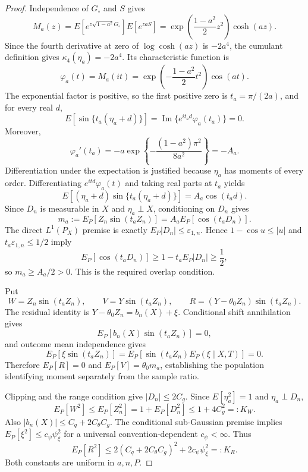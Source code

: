 \documentclass{article}
\begin{document}
\begin{proof}
Independence of \(G_{\circ}\) and \(S\) gives
\[
 M_a(z)
 =E[e^{z\sqrt{1-a^2}G_{\circ}}]E[e^{zaS}]
 =\exp\!\left(\frac{1-a^2}{2}z^2\right)\cosh(az).
\]
Since the fourth derivative at zero of \(\log\cosh(az)\) is \(-2a^4\), the cumulant definition gives \(\kappa_4(\eta_a)=-2a^4\).  Its characteristic function is
\[
 \varphi_a(t)=M_a(it)
 =\exp\!\left(-\frac{1-a^2}{2}t^2\right)\cos(at).
\]
The exponential factor is positive, so the first positive zero is \(t_a=\pi/(2a)\), and for every real \(d\),
\[
 E[\sin\{t_a(\eta_a+d)\}]
 =\operatorname{Im}\{e^{it_ad}\varphi_a(t_a)\}=0.
\]
Moreover,
\[
 \varphi_a'(t_a)
 =-a\exp\!\left\{-\frac{(1-a^2)\pi^2}{8a^2}\right\}=-A_a.
\]
Differentiation under the expectation is justified because \(\eta_a\) has moments of every order.  Differentiating \(e^{itd}\varphi_a(t)\) and taking real parts at \(t_a\) yields
\[
 E[(\eta_a+d)\sin\{t_a(\eta_a+d)\}]=A_a\cos(t_ad).
\]
Since \(D_n\) is measurable in \(X\) and \(\eta_a\perp X\), conditioning on \(D_n\) gives
\[
 m_a:=E_P[Z_n\sin(t_aZ_n)]=A_aE_P[\cos(t_aD_n)].
\]
The direct \(L^1(P_X)\) premise is exactly \(E_P|D_n|\le\varepsilon_{1,n}\).  Hence \(1-\cos u\le|u|\) and \(t_a\varepsilon_{1,n}\le1/2\) imply
\[
 E_P[\cos(t_aD_n)]
 \ge1-t_aE_P|D_n|
 \ge\frac12,
\]
so \(m_a\ge A_a/2>0\).  This is the required overlap condition.

Put
\[
 W=Z_n\sin(t_aZ_n),\qquad
 V=Y\sin(t_aZ_n),\qquad
 R=(Y-\theta_0Z_n)\sin(t_aZ_n).
\]
The residual identity is \(Y-\theta_0Z_n=b_n(X)+\xi\).  Conditional shift annihilation gives
\[
 E_P[b_n(X)\sin(t_aZ_n)]=0,
\]
and outcome mean independence gives
\[
 E_P[\xi\sin(t_aZ_n)]
 =E_P[\sin(t_aZ_n)E_P(\xi\mid X,T)]=0.
\]
Therefore \(E_P[R]=0\) and \(E_P[V]=\theta_0m_a\), establishing the population identifying moment separately from the sample ratio.

Clipping and the range condition give \(|D_n|\le2C_g\).  Since \(E[\eta_a^2]=1\) and \(\eta_a\perp D_n\),
\[
 E_P[W^2]\le E_P[Z_n^2]
 =1+E_P[D_n^2]\le1+4C_g^2=:K_W.
\]
Also \(|b_n(X)|\le C_q+2C_{\theta}C_g\).  The conditional sub-Gaussian premise implies \(E_P[\xi^2]\le c_{\psi}\psi_{\xi}^2\) for a universal convention-dependent \(c_{\psi}<\infty\).  Thus
\[
 E_P[R^2]
 \le2(C_q+2C_{\theta}C_g)^2+2c_{\psi}\psi_{\xi}^2=:K_R.
\]
Both constants are uniform in \(a,n,P\).


\end{proof}
\end{document}
